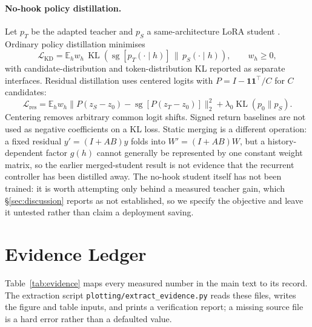 \documentclass{article}
\newcommand{\E}{\mathbb{E}}
\newcommand{\sg}{\operatorname{sg}}
\newcommand{\KL}{\operatorname{KL}}
\begin{document}
\paragraph{No-hook policy distillation.} Let $p_T$ be the adapted teacher and
$p_S$ a same-architecture LoRA student \citep{hu2021lora}. Ordinary policy
distillation minimises
\begin{equation}
 \mathcal L_{\mathrm{KD}}=\E_h w_h\,\KL(\sg[p_T(\cdot\mid h)]\,\|\,p_S(\cdot\mid h)),\qquad w_h\ge0,
\end{equation}
with candidate-distribution and token-distribution KL reported as separate
interfaces. Residual distillation uses centered logits with
$P=I-\mathbf 1\mathbf 1^\top/C$ for $C$ candidates:
\begin{equation}
 \mathcal L_{\mathrm{res}}=\E_h w_h
 \big\|P(z_S-z_0)-\sg[P(z_T-z_0)]\big\|_2^2
 +\lambda_0\KL(p_0\|p_S).
\end{equation}
Centering removes arbitrary common logit shifts. Signed return baselines are not
used as negative coefficients on a KL loss. Static merging is a different
operation: a fixed residual $y'=(I+AB)y$ folds into $W'=(I+AB)W$, but a
history-dependent factor $g(h)$ cannot generally be represented by one constant
weight matrix, so the earlier merged-student result is not evidence that the
recurrent controller has been distilled away. The no-hook student itself has not
been trained: it is worth attempting only behind a measured teacher gain, which
\S\ref{sec:discussion} reports as not established, so we specify the objective
and leave it untested rather than claim a deployment saving.

\section{Evidence Ledger}
\label{app:evidence}
Table~\ref{tab:evidence} maps every measured number in the main text to its
record. The extraction script \texttt{plotting/extract\_evidence.py} reads these
files, writes the figure and table inputs, and prints a verification report; a
missing source file is a hard error rather than a defaulted value.
\end{document}
